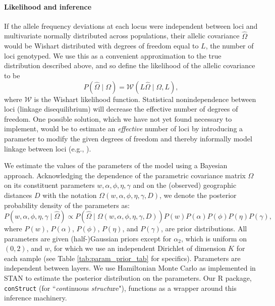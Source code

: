 \documentclass[10pt,letterpaper]{article}
\begin{document}
\paragraph{Likelihood and inference}
If the allele frequency deviations at each locus
were independent between loci and multivariate normally distributed across populations, 
their allelic covariance $\widehat{\Omega}$ 
would be Wishart distributed with degrees of freedom equal to $L$, 
the number of loci genotyped.
We use this as a convenient approximation to the true distribution described above,
and so define the likelihood of the allelic covariance to be
\begin{equation}
    P(\widehat{\Omega} \; | \; \Omega) 
    = 
    \mathcal{W} \left( L\widehat{\Omega} \; | \; \Omega,L\right) ,
\end{equation}
where $\mathcal{W}$ is the Wishart likelihood function.
Statistical nonindependence between loci (linkage disequilibrium)
will decrease the effective
number of degrees of freedom.  
One possible solution, which we have not yet found necessary to implement,
would be to estimate an \emph{effective} number of loci 
by introducing a parameter to modify the given degrees of freedom 
and thereby informally model linkage between loci (e.g., \cite{EEMS}).

We estimate the values of the parameters of the model using a Bayesian approach.
Acknowledging the dependence of the parametric covariance matrix $\Omega$ on its constituent parameters
$w,\alpha,\phi,\eta,\gamma$ and on the (observed) geographic distances $D$ 
with the notation $\Omega(w,\alpha,\phi,\eta,\gamma,D)$,
we denote the posterior probability density of the parameters as:
\begin{equation}
P\left( w,\alpha,\phi,\eta,\gamma \;|\; \widehat{\Omega} \right) 
    \propto
    P\left(\widehat{\Omega} \; | \; \Omega(w,\alpha,\phi,\eta,\gamma,D) \right)
    P(w)P(\alpha)P(\phi)P(\eta)P(\gamma) ,
\end{equation}
where $P(w)$, $P(\alpha)$, $P(\phi)$, $P(\eta)$, and $P(\gamma)$, are prior distributions.
All parameters are given (half-)Gaussian priors 
except for $\alpha_2$, which is uniform on $(0,2)$, 
and $w$, for which we use an independent Dirichlet of dimension $K$ for each sample
(see Table \ref{tab:param_prior_tab} for specifics).
Parameters are independent between layers.
We use Hamiltonian Monte Carlo as implemented in STAN \cite{stan, NUTS, stan_lib, rstan} 
to estimate the posterior distribution on the parameters.
Our R package, \texttt{conStruct} (for ``\emph{con}tinuous \emph{struct}ure"),
functions as a wrapper around this inference machinery.
\end{document}
